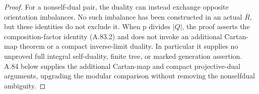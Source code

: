 \begin{proof}
For a nonself-dual pair, the duality can instead exchange
opposite orientation imbalances. No such imbalance has
been constructed in an actual \(\overline R\), but
these identities do not exclude it. When p divides
\(|Q|\), the proof asserts the composition-factor
identity (A.83.2) and does not invoke an additional
Cartan-map theorem or a compact inverse-limit duality.
In particular it supplies no unproved full integral
self-duality, finite tree, or marked generation assertion.
A.84 below supplies the additional Cartan-map and compact
projective-dual arguments, upgrading the modular comparison
without removing the nonselfdual ambiguity.
\end{proof}

